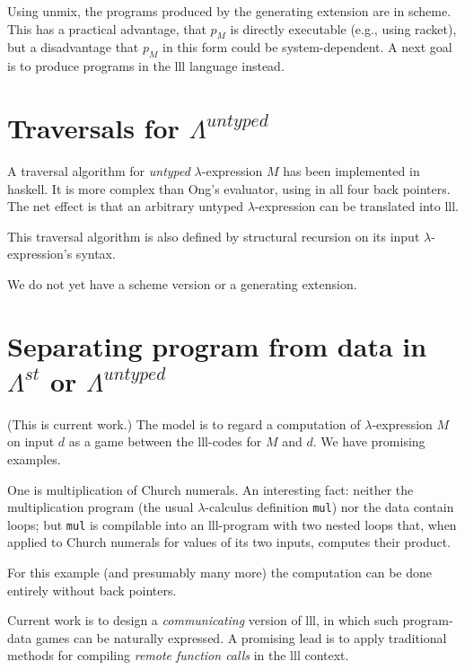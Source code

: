 \documentclass{llncs}
\begin{document}
{\item Using {\sc unmix}, the programs produced by the generating extension are in {\sc scheme}. This has a practical advantage, that $p_M$ is directly executable (e.g., using {\sc racket}), but a disadvantage that $p_M$ in this form could be system-dependent. A next goal is to produce programs in the {\sc lll} language instead.

\ee

\section{Traversals for $\Lambda^{untyped}$}

\be

\item A traversal algorithm for {\em untyped} $\lambda$-expression $M$ has been implemented in {\sc haskell}. It is more complex than Ong's evaluator, using in all four back pointers. The net effect is that an arbitrary untyped $\lambda$-expression can be translated into {\sc lll}.

\item This traversal algorithm is also defined by structural recursion on its input $\lambda$-expression's syntax.

\item We do not yet have a {\sc scheme} version or a generating extension.

\ee


\section{Separating program from data in $\Lambda^{st}$ or $\Lambda^{untyped}$}

(This is current work.) The model is to regard a computation of $\lambda$-expression $M$ on input $d$ as a game between the {\sc lll}-codes for $M$ and $d$. We have promising examples. 

One is multiplication of Church numerals. An interesting fact: neither the multiplication program (the usual $\lambda$-calculus definition {\tt mul}) nor the data contain loops; but  {\tt mul} is compilable into an {\sc lll}-program with two nested loops that, when applied to Church numerals for  values of its two inputs,  computes their product.

For this example (and presumably many more) the computation can be done entirely without back pointers.
\vair

\fl Current work is to design a {\em communicating} version of {\sc lll}, in which such program-data games can be naturally expressed. A promising lead is to apply traditional methods for compiling {\em remote function calls} in the {\sc lll} context.

}
\end{document}
